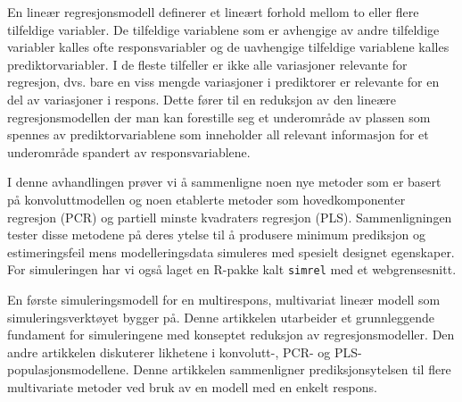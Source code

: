 En lineær regresjonsmodell definerer et lineært forhold mellom to eller
flere tilfeldige variabler. De tilfeldige variablene som er avhengige av
andre tilfeldige variabler kalles ofte responsvariabler og de uavhengige
tilfeldige variablene kalles prediktorvariabler. I de fleste tilfeller
er ikke alle variasjoner relevante for regresjon, dvs. bare en viss
mengde variasjoner i prediktorer er relevante for en del av variasjoner
i respons. Dette fører til en reduksjon av den lineære
regresjonsmodellen der man kan forestille seg et underområde av plassen
som spennes av prediktorvariablene som inneholder all relevant
informasjon for et underområde spandert av responsvariablene.

I denne avhandlingen prøver vi å sammenligne noen nye metoder som er
basert på konvoluttmodellen og noen etablerte metoder som
hovedkomponenter regresjon (PCR) og partiell minste kvadraters regresjon
(PLS). Sammenligningen tester disse metodene på deres ytelse til å
produsere minimum prediksjon og estimeringsfeil mens modelleringsdata
simuleres med spesielt designet egenskaper. For simuleringen har vi også
laget en R-pakke kalt \texttt{simrel} med et webgrensesnitt.

En første simuleringsmodell for en multirespons, multivariat lineær
modell som simuleringsverktøyet bygger på. Denne artikkelen utarbeider
et grunnleggende fundament for simuleringene med konseptet reduksjon av
regresjonsmodeller. Den andre artikkelen diskuterer likhetene i
konvolutt-, PCR- og PLS-populasjonsmodellene. Denne artikkelen
sammenligner prediksjonsytelsen til flere multivariate metoder ved bruk
av en modell med en enkelt respons.
